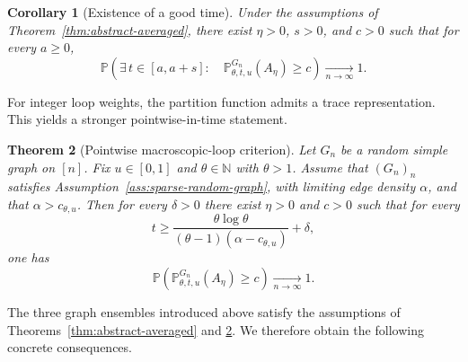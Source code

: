 \documentclass[11pt]{article}
\newtheorem{theorem}{Theorem}[section]
\newtheorem{corollary}[theorem]{Corollary}
\theoremstyle{remark}
\theoremstyle{plain}
\newcommand{\Pbb}{\mathbb{P}}
\newcommand{\1}{\mathbbm{1}}
\begin{document}
\begin{corollary}[Existence of a good time]
\label{cor:abstract-good-time}
Under the assumptions of Theorem~\ref{thm:abstract-averaged}, there exist
\(\eta>0\), \(s>0\), and \(c>0\) such that for every \(a\ge 0\),
\[
\Pbb\!\left(
\exists\, t\in[a,a+s]:
\quad
\Pbb^{G_n}_{\theta,t,u}(A_\eta)\ge c
\right)\xrightarrow[n\to\infty]{}1.
\]
\end{corollary}
For integer loop weights, the partition function admits a trace representation.
This yields a stronger pointwise-in-time statement.
\begin{theorem}[Pointwise macroscopic-loop criterion]
\label{thm:abstract-pointwise}
Let \(G_n\) be a random simple graph on \([n]\). Fix \(u\in[0,1]\) and
\(\theta\in\mathbb N\) with \(\theta>1\). Assume that \((G_n)_n\) satisfies
Assumption~\ref{ass:sparse-random-graph}, with limiting edge density \(\alpha\), and that $\alpha>c_{\theta,u}$.
Then for every \(\delta>0\) there exist \(\eta>0\) and \(c>0\) such that for every
\[
t\ge \frac{\theta\log\theta}{(\theta-1)(\alpha-c_{\theta,u})}+\delta,
\]
one has
\[
\Pbb\!\left(
\Pbb^{G_n}_{\theta,t,u}(A_\eta)\ge c
\right)\xrightarrow[n\to\infty]{}1.
\]
\end{theorem}
The three graph ensembles introduced above satisfy the assumptions of
Theorems~\ref{thm:abstract-averaged} and \ref{thm:abstract-pointwise}. We
therefore obtain the following concrete consequences.
\end{document}
